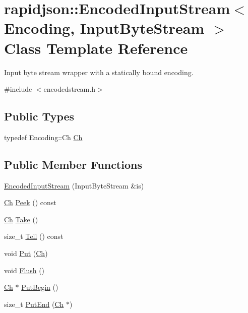 \hypertarget{classrapidjson_1_1_encoded_input_stream}{}\section{rapidjson\+::Encoded\+Input\+Stream$<$ Encoding, Input\+Byte\+Stream $>$ Class Template Reference}
\label{classrapidjson_1_1_encoded_input_stream}


Input byte stream wrapper with a statically bound encoding.  




{\ttfamily \#include $<$encodedstream.\+h$>$}

\subsection*{Public Types}
\begin{DoxyCompactItemize}
\item 
typedef Encoding\+::\+Ch \mbox{\hyperlink{classrapidjson_1_1_encoded_input_stream_ac1cf99de822b615beaa5e33ac989a20a}{Ch}}
\end{DoxyCompactItemize}
\subsection*{Public Member Functions}
\begin{DoxyCompactItemize}
\item 
\mbox{\hyperlink{classrapidjson_1_1_encoded_input_stream_a0eec878bbb78d4e672212931dd566eb3}{Encoded\+Input\+Stream}} (Input\+Byte\+Stream \&is)
\item 
\mbox{\hyperlink{classrapidjson_1_1_encoded_input_stream_ac1cf99de822b615beaa5e33ac989a20a}{Ch}} \mbox{\hyperlink{classrapidjson_1_1_encoded_input_stream_a120a6eb51f4e96dc164ffa70659b34f7}{Peek}} () const
\item 
\mbox{\hyperlink{classrapidjson_1_1_encoded_input_stream_ac1cf99de822b615beaa5e33ac989a20a}{Ch}} \mbox{\hyperlink{classrapidjson_1_1_encoded_input_stream_a6182dbfa7cf1c5f29e1cc0e9b575c95e}{Take}} ()
\item 
size\+\_\+t \mbox{\hyperlink{classrapidjson_1_1_encoded_input_stream_a6142e8348c47443eddce35bf7203ca29}{Tell}} () const
\item 
void \mbox{\hyperlink{classrapidjson_1_1_encoded_input_stream_a518de4fc2f2da0d55005d6334a93a704}{Put}} (\mbox{\hyperlink{classrapidjson_1_1_encoded_input_stream_ac1cf99de822b615beaa5e33ac989a20a}{Ch}})
\item 
void \mbox{\hyperlink{classrapidjson_1_1_encoded_input_stream_a56f9a8c6636976e173f41f88f0028dbb}{Flush}} ()
\item 
\mbox{\hyperlink{classrapidjson_1_1_encoded_input_stream_ac1cf99de822b615beaa5e33ac989a20a}{Ch}} $\ast$ \mbox{\hyperlink{classrapidjson_1_1_encoded_input_stream_a65d027f1323e1f615b5893c3625cacd0}{Put\+Begin}} ()
\item 
size\+\_\+t \mbox{\hyperlink{classrapidjson_1_1_encoded_input_stream_a4caab7f136c784d2d47539bedb106b35}{Put\+End}} (\mbox{\hyperlink{classrapidjson_1_1_encoded_input_stream_ac1cf99de822b615beaa5e33ac989a20a}{Ch}} $\ast$)
\end{DoxyCompactItemize}
